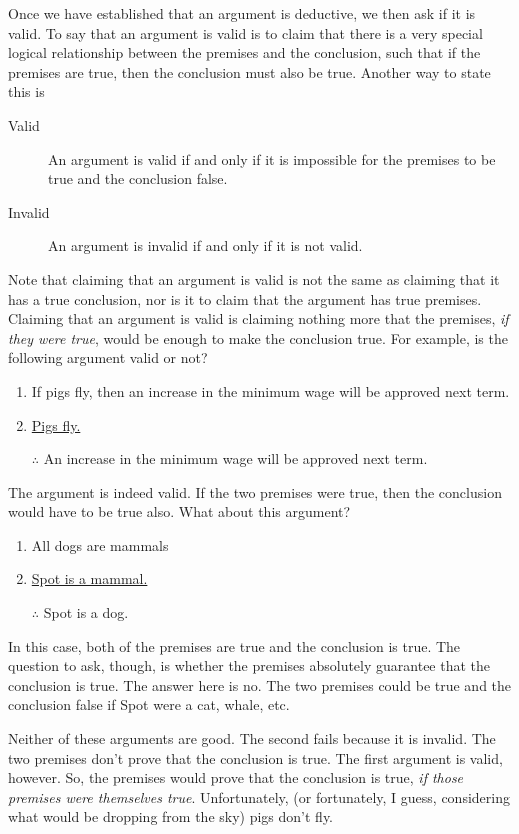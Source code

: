 Once we have established that an argument is deductive, we then ask if it is valid. To say that an argument is valid is to claim that there is a very special logical relationship between the premises and the conclusion, such that if the premises are true, then the conclusion must also be true. Another way to state this is

\begin{description}
\item [Valid] An argument is valid if and only if it is impossible for the premises to be true and the conclusion false.
\item [Invalid] An argument is invalid if and only if it is not valid.
\end{description}

Note that claiming that an argument is valid is not the same as claiming that it has a true conclusion, nor is it to claim that the argument has true premises. Claiming that an argument is valid is claiming nothing more that the premises, \emph{if they were true}, would be enough to make the conclusion true. For example, is the following argument valid or not?


\begin{enumerate}
\item If pigs fly, then an increase in the minimum wage will be approved next term.
\item \underline{Pigs fly.}
\item [$\therefore$] An increase in the minimum wage will be approved next term.
\end{enumerate}


The argument is indeed valid. If the two premises were true, then the
conclusion would have to be true also. What about this argument?

\begin{enumerate}
\item All dogs are mammals 
\item \underline{Spot is a mammal.}
\item [$\therefore$] Spot is a dog.
\end{enumerate}

In this case, both of the premises are true and the conclusion is true. The question to ask, though, is whether the premises absolutely guarantee that the conclusion is true. The answer here is no. The two premises could be true and the conclusion false if Spot were a cat, whale, etc.

Neither of these arguments are good. The second fails because it is invalid. The two premises don't prove that the conclusion is true. The first argument is valid, however. So, the premises would prove that the conclusion is true, \emph{if those premises were themselves true}. Unfortunately, (or fortunately, I guess, considering what would be dropping from the sky) pigs don't fly.

